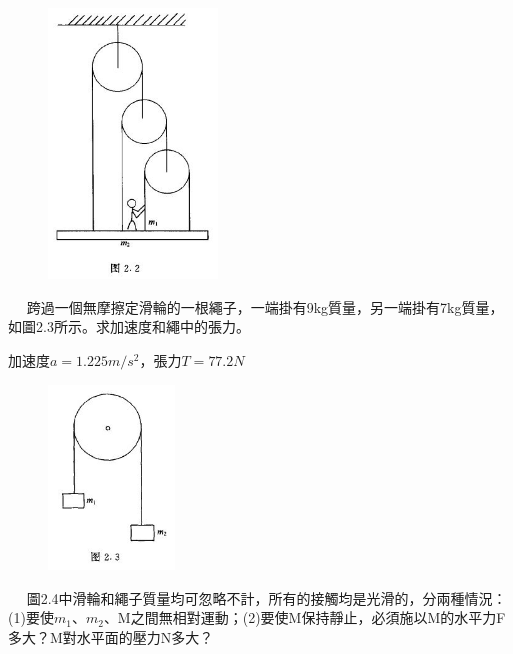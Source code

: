 \documentclass[cn,10pt,math=newtx,chinesefont=founder]{../elegantbook}
\begin{document}
\begin{figure}[htbp]
\flushright
\includegraphics[width=0.4\textwidth]{image/2.2.JPG}
\end{figure}

\newpage


\begin{example}　
    跨過一個無摩擦定滑輪的一根繩子，一端掛有9kg質量，另一端掛有7kg質量，如圖2.3所示。求加速度和繩中的張力。
    
    \rightline{[2.1.3]}
\end{example}

\begin{solution}
加速度$a=1.225m/s^2$，張力$T=77.2N$
\end{solution}

\begin{figure}[htbp]
\flushright
\includegraphics[width=0.3\textwidth]{image/2.3.JPG}
\end{figure}

\newpage


\begin{example}　
    圖2.4中滑輪和繩子質量均可忽略不計，所有的接觸均是光滑的，分兩種情況：(1)要使$m_1$、$m_2$、M之間無相對運動；(2)要使M保持靜止，必須施以M的水平力F多大？M對水平面的壓力N多大？
    
    \rightline{[2.1.4]}
\end{example}
\end{document}
